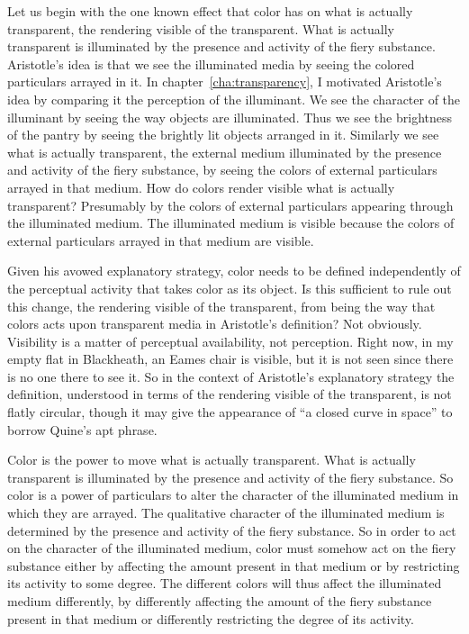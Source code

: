 Let us begin with the one known effect that color has on what is actually transparent, the rendering visible of the transparent. What is actually transparent is illuminated by the presence and activity of the fiery substance. Aristotle's idea is that we see the illuminated media by seeing the colored particulars arrayed in it. In chapter~\ref{cha:transparency}, I motivated Aristotle's idea by comparing it the perception of the illuminant. We see the character of the illuminant by seeing the way objects are illuminated. Thus we see the brightness of the pantry by seeing the brightly lit objects arranged in it. Similarly we see what is actually transparent, the external medium illuminated by the presence and activity of the fiery substance, by seeing the colors of external particulars arrayed in that medium. How do colors render visible what is actually transparent? Presumably by the colors of external particulars appearing through the illuminated medium. The illuminated medium is visible because the colors of external particulars arrayed in that medium are visible. 

Given his avowed explanatory strategy, color needs to be defined independently of the perceptual activity that takes color as its object. Is this sufficient to rule out this change, the rendering visible of the transparent, from being the way that colors acts upon transparent media in Aristotle's definition? Not obviously. Visibility is a matter of perceptual availability, not perception. Right now, in my empty flat in Blackheath, an Eames chair is visible, but it is not seen since there is no one there to see it. So in the context of Aristotle's explanatory strategy the definition, understood in terms of the rendering visible of the transparent, is not flatly circular, though it may give the appearance of ``a closed curve in space'' to borrow Quine's \citeyearpar{Quine:1951fk} apt phrase.

Color is the power to move what is actually transparent. What is actually transparent is illuminated by the presence and activity of the fiery substance. So color is a power of particulars to alter the character of the illuminated medium in which they are arrayed. The qualitative character of the illuminated medium is determined by the presence and activity of the fiery substance. So in order to act on the character of the illuminated medium, color must somehow act on the fiery substance either by affecting the amount present in that medium or by restricting its activity to some degree. The different colors will thus affect the illuminated medium differently, by differently affecting the amount of the fiery substance present in that medium or differently restricting the degree of its activity.


